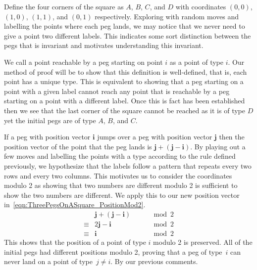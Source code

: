 \begin{parts}
	\begin{solution}
	
		Define the four corners of the square as $A$, $B$, $C$, and $D$ with coordinates $(0, 0)$, $(1, 0)$, $(1, 1)$, and $(0, 1)$ respectively. Exploring with random moves and labelling the points where each peg lands, we may notice that we never need to give a point two different labels. This indicates some sort distinction between the pegs that is invariant and motivates understanding this invariant.
		
		We call a point reachable by a peg starting on point $i$ as a point of type $i$. Our method of proof will be to show that this definition is well-defined, that is, each point has a unique type. This is equivalent to showing that a peg starting on a point with a given label cannot reach any point that is reachable by a peg starting on a point with a different label. Once this is fact has been established then we see that the last corner of the square cannot be reached as it is of type $D$ yet the initial pegs are of type $A$, $B$, and $C$.
		
		If a peg with position vector $\mathbf{i}$ jumps over a peg with position vector $\mathbf{j}$ then the position vector of the point that the peg lands is $\mathbf{j} + (\mathbf{j} - \mathbf{i})$. By playing out a few moves and labelling the points with a type according to the rule defined previously, we hypothesize that the labels follow a pattern that repeats every two rows and every two columns. This motivates us to consider the coordinates modulo 2 as showing that two numbers are different modulo 2 is sufficient to show the two numbers are different. We apply this to our new position vector in~\eqref{eqn:ThreePegsOnASquare_PositionMod2}.
		\begin{equation}
			\begin{alignedat}{2}
				& \mathbf{j} + (\mathbf{j} - \mathbf{i}) \quad && \mod 2 \\
				\equiv{} & 2\mathbf{j} - \mathbf{i} \quad && \mod 2 \\
				\equiv{} & \mathbf{i} \quad && \mod 2
			\end{alignedat}
			\label{eqn:ThreePegsOnASquare_PositionMod2}
		\end{equation}
		This shows that the position of a point of type $i$ modulo 2 is preserved. All of the initial pegs had different positions modulo 2, proving that a peg of type~$i$ can never land on a point of type~$j \ne i$. By our previous comments.
	
	\end{solution}
	

\end{parts}
